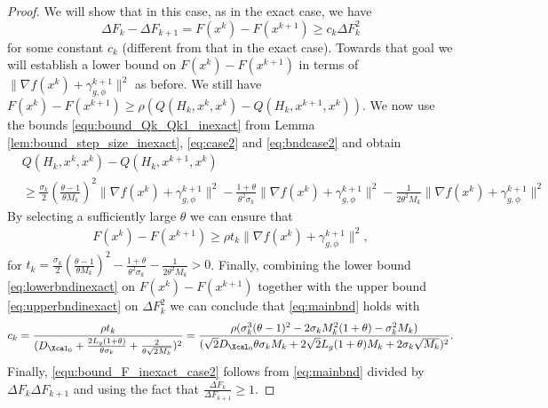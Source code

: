 \documentclass[11pt]{article}
\numberwithin{equation}{section}
\begin{document}
\begin{proof}
	We will  show that in this case, as in the exact case,  we have 
	\begin{equation}\label{eq:mainbnd}
		\Delta F_k - \Delta F_{k+1} = 
		 F(x^k) - F(x^{k+1})\geq c_k \Delta F_k^2
	\end{equation} for some constant $c_k$ (different from that in the exact case).  
	Towards that goal  we will establish a lower bound on $F(x^{k})-F(x^{k+1})$ in terms of $\|\nabla f(x^k)+\gamma_{g, \phi}^{k+1}\|^2$ as before.
	We still have $F(x^{k})-F(x^{k+1})\geq \rho (Q(H_k, x^{k}, x^k)-Q(H_k,x^{k+1}, x^k))$. 
	We now use the bounds \eqref{equ:bound_Qk_Qk1_inexact} from Lemma  \ref{lem:bound_step_size_inexact}, \eqref{eq:case2} and \eqref{eq:bndcase2} and obtain
	\begin{align*}
		&Q(H_k,x^k,x^k) - Q(H_k,x^{k+1}, x^k) \\
		&\geq \frac{\sigma_k}{2}(\frac{\theta-1}{\theta M_k})^2 \| \nabla f(x^k) + \gamma_{g, \phi}^{k+1} \|^2
		- \frac{1+\theta}{\theta^2\sigma_k}\| \nabla f(x^k) + \gamma_{g, \phi}^{k+1} \|^2 
		- \frac{1}{2\theta^2M_k}\| \nabla f(x^k) + \gamma_{g, \phi}^{k+1} \|^2
	\end{align*}
	By selecting a sufficiently large $\theta$  we can ensure that 
	\begin{align}
	\label{eq:lowerbndinexact}
	    F(x^k) - F(x^{k+1})\geq \rho t_k \| \nabla f(x^k) + \gamma_{g, \phi}^{k+1} \|^2,
	\end{align}
	for $t_k=\frac{\sigma_k}{2}(\frac{\theta-1}{\theta M_k})^2 - \frac{1+\theta}{\theta^2\sigma_k}- \frac{1}{2\theta^2M_k}>0$. 
	Finally, combining the lower bound \eqref{eq:lowerbndinexact} on $F(x^{k})-F(x^{k+1})$ together with the upper bound \eqref{eq:upperbndinexact}
	on $\Delta F_k^2$  we can conclude that \eqref{eq:mainbnd} holds with 
	\begin{align*}
		c_k= \frac{\rho t_k}{(D_{\Xcal_0} + \frac{2L_g(1+\theta)}{\theta\sigma_k} + \frac{2}{\theta\sqrt{2M_k}})^2} = \frac{\rho(\sigma_k^3(\theta-1)^2 - 2\sigma_kM_k^2(1+\theta) - \sigma_k^2M_k )}{(\sqrt{2}D_{\Xcal_0}\theta\sigma_kM_k + 2\sqrt{2}L_g(1+\theta)M_k + 2\sigma_k\sqrt{M_k} )^2}.    
	\end{align*}
	Finally, \eqref{equ:bound_F_inexact_case2} follows from \eqref{eq:mainbnd} divided by $\Delta F_k\Delta F_{k+1}$ and using the fact that $\frac{\Delta F_k}{\Delta F_{k+1}} \geq 1$.
	
\end{proof}
\end{document}
